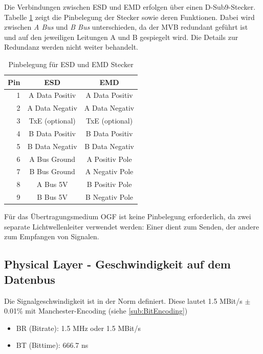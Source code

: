 Die Verbindungen zwischen ESD und EMD erfolgen über einen D-Sub9-Stecker. Tabelle \ref{tab:PinESDEMD} zeigt die Pinbelegung der Stecker sowie deren Funktionen. Dabei wird zwischen \textit{A Bus} und \textit{B Bus} unterschieden, da der MVB redundant geführt ist und auf den jeweiligen Leitungen A und B gespiegelt wird. Die Details zur Redundanz werden nicht weiter behandelt.


\begin{table}[H]
    \centering
    \begin{tabular}{|r||c|c|} \hline
        Pin & ESD & EMD\\ \hline
        1 & A Data Positiv & A Data Positiv\\ \hline
        2 & A Data Negativ & A Data Negativ\\ \hline
        3 & TxE (optional) & TxE (optional)\\ \hline
        4 & B Data Positiv & B Data Positiv\\ \hline
        5 & B Data Negativ & B Data Negativ\\ \hline
        6 & A Bus Ground & A Positiv Pole\\ \hline
        7 & B Bus Ground & A Negativ Pole\\ \hline
        8 & A Bus 5V & B Positiv Pole\\ \hline
        9 & B Bus 5V & B Negativ Pole\\ \hline
    \end{tabular}
    \caption{Pinbelegung für ESD und EMD Stecker}
    \label{tab:PinESDEMD}
\end{table}

Für das Übertragungsmedium OGF ist keine Pinbelegung erforderlich, da zwei separate Lichtwellenleiter verwendet werden: Einer dient zum Senden, der andere zum Empfangen von Signalen.

\subsection{Physical Layer - Geschwindigkeit auf dem Datenbus}
\label{sub:GeschwindigkeitDatenbus}
Die Signalgeschwindigkeit ist in der Norm definiert. Diese lautet 1.5 MBit/s $\pm$ 0.01\% mit Manchester-Encoding (siehe \ref{sub:BitEncoding})

\begin{itemize}
  \item BR (Bitrate): 1.5 MHz oder 1.5 MBit/s
  \item BT (Bittime): 666.7 ns
\end{itemize}